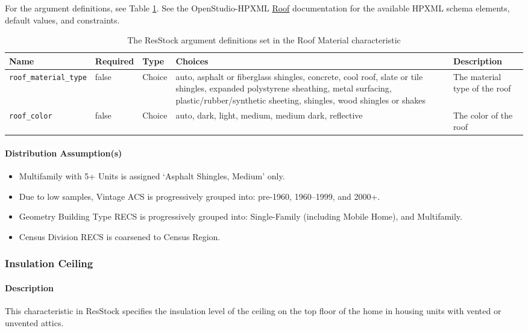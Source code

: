 For the argument definitions, see Table \ref{table:hc_arg_def_roof_mat}. See the OpenStudio-HPXML \href{https://openstudio-hpxml.readthedocs.io/en/v1.8.1/workflow_inputs.html#hpxml-roof}{Roof} documentation for the available HPXML schema elements, default values, and constraints.

\begin{longtable}[]{|p{3.5cm}|p{1.1cm}|p{1.1cm}|p{3.5cm}|p{3.3cm}|} \caption{The ResStock argument definitions set in the Roof Material characteristic} \label{table:hc_arg_def_roof_mat} \\

\toprule\noalign{}
Name & Required &  Type & Choices & Description \\
\midrule\noalign{}
\endhead
\bottomrule\noalign{}
\endlastfoot
\texttt{roof\_material\_type} & false & Choice & auto, asphalt or
fiberglass shingles, concrete, cool roof, slate or tile shingles,
expanded polystyrene sheathing, metal surfacing,
plastic/rubber/synthetic sheeting, shingles, wood shingles or shakes &
The material type of the roof \\
\hline
\texttt{roof\_color} & false  & Choice & auto, dark, light, medium,
medium dark, reflective & The color of the roof \\
\end{longtable}
\paragraph{Distribution Assumption(s)}

\begin{itemize}
 
\item
  Multifamily with 5+ Units is assigned `Asphalt
  Shingles, Medium' only.
\item
  Due to low samples, Vintage ACS is progressively grouped into:
  pre-1960, 1960--1999, and 2000+.
\item
  Geometry Building Type RECS is progressively grouped into:
  Single-Family (including Mobile Home), and Multifamily.
\item
  Census Division RECS is coarsened to Census Region.
\end{itemize}

\subsubsection{Insulation Ceiling}\label{insulation_ceiling}
\paragraph{Description}
This characteristic in ResStock specifies the insulation level of the ceiling on the top floor of the home in housing units with vented or unvented attics. 

